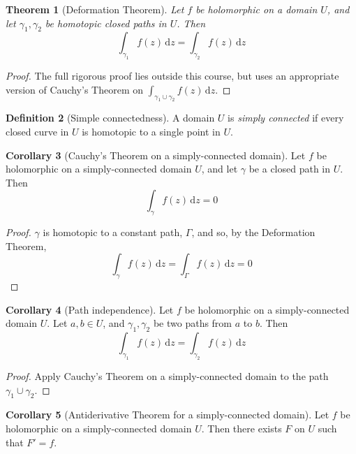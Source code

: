 \documentclass[10pt,fleqn]{article}
\newcommand{\diff}{\,\mathrm{d}}
\theoremstyle{definition} \newtheorem{defn}{Definition}[section]
\theoremstyle{plain}      \newtheorem{thm}[defn]{Theorem}
\theoremstyle{definition} \newtheorem{prop}[defn]{Proposition}
\theoremstyle{plain}      \newtheorem{lem}[defn]{Lemma}
\theoremstyle{definition} \newtheorem{cor}[defn]{Corollary}
\theoremstyle{definition} \newtheorem{ex}[defn]{Example}
\theoremstyle{definition} \newtheorem{rem}[defn]{Remark}
\begin{document}
\begin{thm}[Deformation Theorem]
    Let $f$ be holomorphic on a domain $U$, and let $\gamma_1,\gamma_2$ be homotopic closed paths in $U$.
    Then
    \begin{equation}
        \int_{\gamma_1} f(z)\diff z=
        \int_{\gamma_2} f(z)\diff z
    \end{equation}
\end{thm}

\begin{proof}
    The full rigorous proof lies outside this course, but uses an appropriate version of Cauchy's Theorem on $\int_{\gamma_1\cup\gamma_2}f(z) \diff z$.
\end{proof}

\begin{defn}[Simple connectedness]
    A domain $U$ is \emph{simply connected} if every closed curve in $U$ is homotopic to a single point in $U$.
\end{defn}

\begin{cor}[Cauchy's Theorem on a simply-connected domain]
    Let $f$ be holomorphic on a simply-connected domain $U$, and let $\gamma$ be a closed path in $U$.
    Then
    \begin{equation}
        \int_{\gamma} f(z)\diff z=0
    \end{equation}
\end{cor}

\begin{proof}
    $\gamma$ is homotopic to a constant path, $\Gamma$, and so, by the Deformation Theorem,
    \[
        \int_{\gamma} f(z)\diff z=
        \int_{\Gamma} f(z)\diff z=
        0
    \]
\end{proof}

\begin{cor}[Path independence]
    Let $f$ be holomorphic on a simply-connected domain $U$.
    Let $a,b\in U$, and $\gamma_1,\gamma_2$ be two paths from $a$ to $b$.
    Then
    \[
        \int_{\gamma_1} f(z)\diff z=
        \int_{\gamma_2} f(z)\diff z
    \]
\end{cor}

\begin{proof}
    Apply Cauchy's Theorem on a simply-connected domain to the path $\gamma_1\cup\gamma_2$.
\end{proof}

\begin{cor}[Antiderivative Theorem for a simply-connected domain]
    Let $f$ be holomorphic on a simply-connected domain $U$.
    Then there exists $F$ on $U$ such that $F'=f$.
\end{cor}
\end{document}
